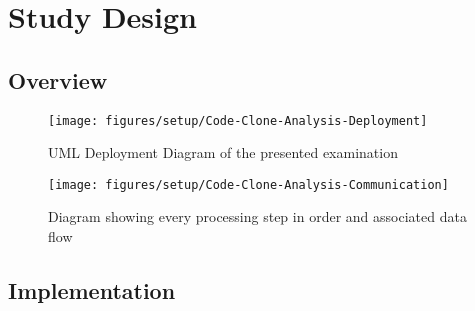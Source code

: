 
\section{Study Design}
\label{sec:study_design}


\subsection{Overview}

\begin{figure}[htb]
	\label{fig:overview_deployment}
	\centering
	\texttt{[image: figures/setup/Code-Clone-Analysis-Deployment]}
	\caption{UML Deployment Diagram of the presented examination}
\end{figure}

\begin{figure}[htb]
	\label{fig:overview_communication}
	\centering
	\texttt{[image: figures/setup/Code-Clone-Analysis-Communication]}
	\caption{Diagram showing every processing step in order and associated data flow}
\end{figure}

\subsection{Implementation}
